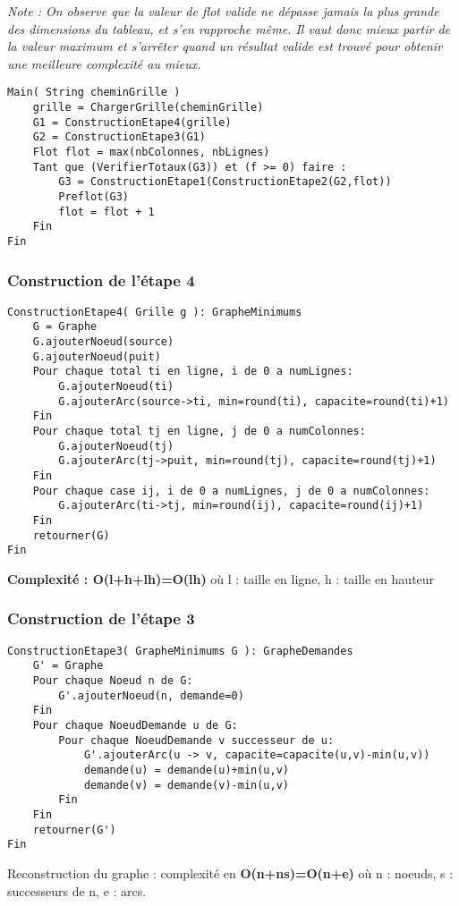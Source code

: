 \documentclass[letterpaper,12pt]{article}
\begin{document}
 \textit{Note : On observe que la valeur de flot valide ne dépasse jamais la plus grande des dimensions du tableau, et s'en rapproche même. Il vaut donc mieux partir de la valeur maximum et s'arrêter quand un résultat valide est trouvé pour obtenir une meilleure complexité au mieux.}
\hfill \break

\begin{lstlisting}
Main( String cheminGrille )
    grille = ChargerGrille(cheminGrille)
    G1 = ConstructionEtape4(grille)
    G2 = ConstructionEtape3(G1)
    Flot flot = max(nbColonnes, nbLignes)
    Tant que (VerifierTotaux(G3)) et (f >= 0) faire :
	    G3 = ConstructionEtape1(ConstructionEtape2(G2,flot))
	    Preflot(G3)
	    flot = flot + 1
    Fin
Fin
\end{lstlisting}\subsubsection{Construction de l'étape 4}
\begin{lstlisting}
ConstructionEtape4( Grille g ): GrapheMinimums
    G = Graphe
    G.ajouterNoeud(source)
    G.ajouterNoeud(puit)
    Pour chaque total ti en ligne, i de 0 a numLignes:
        G.ajouterNoeud(ti)
        G.ajouterArc(source->ti, min=round(ti), capacite=round(ti)+1)
    Fin
    Pour chaque total tj en ligne, j de 0 a numColonnes:
        G.ajouterNoeud(tj)
        G.ajouterArc(tj->puit, min=round(tj), capacite=round(tj)+1)
    Fin
    Pour chaque case ij, i de 0 a numLignes, j de 0 a numColonnes:
        G.ajouterArc(ti->tj, min=round(ij), capacite=round(ij)+1)
    Fin
    retourner(G)
Fin
\end{lstlisting}
\textbf{Complexité : O(l+h+lh)=O(lh)} où l : taille en ligne, h : taille en hauteur
\hfill \break

\subsubsection{Construction de l'étape 3}
\begin{lstlisting}
ConstructionEtape3( GrapheMinimums G ): GrapheDemandes
    G' = Graphe
    Pour chaque Noeud n de G:
        G'.ajouterNoeud(n, demande=0)
    Fin
    Pour chaque NoeudDemande u de G:
        Pour chaque NoeudDemande v successeur de u:
            G'.ajouterArc(u -> v, capacite=capacite(u,v)-min(u,v))
            demande(u) = demande(u)+min(u,v)
            demande(v) = demande(v)-min(u,v)
        Fin
    Fin
    retourner(G')
Fin
\end{lstlisting}
Reconstruction du graphe : complexité en \textbf{O(n+ns)=O(n+e)} où n : noeuds, s : successeurs de n, e : arcs.
\end{document}
